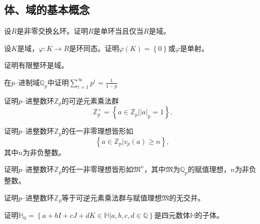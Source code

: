 \subsection{体、域的基本概念}
\begin{prob}
设$R$是非零交换幺环。证明$R$是单环当且仅当$R$是域。
\end{prob}

\begin{prob}
设$K$是域，$\varphi :K\rightarrow R$是环同态。证明$\varphi \left(K\right)=\left\{0 \right\}$或$\varphi $是单射。
\end{prob}

\begin{prob}
证明有限整环是域。
\end{prob}

\begin{prob}
在$p$--进制域$\mathbb{Q}_p$中证明$\displaystyle \sum _{i=1}^{\infty }p^{i}=\frac{1}{1-p}$
\end{prob}

\begin{prob}
证明$p$--进整数环$\mathbb{Z}_p$的可逆元素乘法群
\begin{equation*}
\mathbb{Z}_{p}^{\times }=\left\{a\in \mathbb{Z}_{p}\vert \left\lvert a \right\rvert _{p}=1 \right\}.
\end{equation*}
\end{prob}

\begin{prob}
证明$p$--进整数环$\mathbb{Z}_p$的任一非零理想皆形如
\begin{equation*}
\left\{a\in \mathbb{Z}_{p}\vert v_{p}\left(a\right)\geqslant n \right\},
\end{equation*}
其中$n$为非负整数。
\end{prob}

\begin{prob}
证明$p$--进整数环$\mathbb{Z}_p$的任一非零理想皆形如$\mathfrak{M}^{n}$，其中$\mathfrak{M}$为$\mathbb{Q}_p$的赋值理想，$n$为非负整数。
\end{prob}

\begin{prob}
证明$p$--进整数环$\mathbb{Z}_{p}$等于可逆元素乘法群与赋值理想$\mathfrak{M}$的无交并。
\end{prob}

\begin{prob}
证明$\mathbb{H}_0=\left\{a+bI+cJ+dK\in \mathbb{H}\vert a,b,c,d\in \mathbb{Q} \right\}$是四元数体$\mathbb{H}$的子体。
\end{prob}


